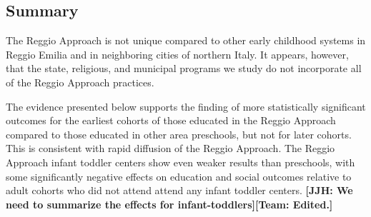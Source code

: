 \subsection{Summary}

The Reggio Approach is not unique compared to other early childhood systems in Reggio Emilia and in neighboring cities of northern Italy. It appears, however, that the state, religious, and municipal programs we study do not incorporate all of the Reggio Approach practices.

The evidence presented below supports the finding of more statistically significant outcomes for the earliest cohorts of those educated in the Reggio Approach compared to those educated in other area preschools, but not for later cohorts. This is consistent with rapid diffusion of the Reggio Approach. The Reggio Approach infant toddler centers show even weaker results than preschools, with some significantly negative effects on education and social outcomes relative to adult cohorts who did not attend attend any infant toddler centers. \textbf{[JJH: We need to summarize the effects for infant-toddlers][Team: Edited.]}
